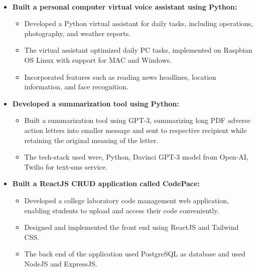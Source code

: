 \documentclass[10pt,article]{article}
\newcommand{\resheading}[1]{{\small \colorbox{mygrey} { \begin{minipage}{0.99\textwidth}\centering{\textbf{#1 \vphantom{p\^{E}}}}\end{minipage}}}}
\begin{document}
\noindent
\resheading{\textbf{PROJECTS} }\\[-0.5cm]
\begin{itemize}

\setlength\itemsep{-0.5em}

\item \textbf{Built a personal computer virtual voice assistant using Python:} 
\begin{itemize}[noitemsep,nolistsep]
    \item Developed a Python virtual assistant for daily tasks, including operations, photography, and weather reports.
 \item The virtual assistant optimized daily PC tasks, implemented on Raspbian OS Linux with support for MAC and Windows.
 \item Incorporated features such as reading news headlines, location information, and face recognition.
 \end{itemize}
 
\item \textbf{Developed a summarization tool using Python: } 
\begin{itemize}[noitemsep,nolistsep]
    \item Built a summarization tool using GPT-3, summarizing long PDF adverse action letters into smaller message and sent to respective recipient while retaining the original meaning of the letter.
 \item The tech-stack used were, Python, Davinci GPT-3 model from Open-AI, Twilio for text-sms service.
 \end{itemize}

 \item \textbf{Built a ReactJS CRUD application called CodePace: }
\begin{itemize}[noitemsep,nolistsep]
    \item Developed a college laboratory code management web application, enabling students to upload and access their code conveniently.
 \item Designed and implemented the front end using ReactJS and Tailwind CSS.
 \item The back end of the application used PostgreSQL as database and used NodeJS and ExpressJS.
 \end{itemize}

\end{itemize}



\end{document}
